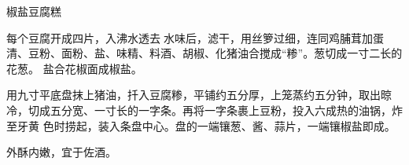 \begin{recipe}{椒盐豆腐糕}

\ingredients


\preparation

\step 每个豆腐开成四片，入沸水透去𥑲水味后，滤干，用丝箩过细，连同鸡脯茸加蛋
清、豆粉、面粉、盐、味精、料酒、胡椒、化猪油合搅成“糁”。葱切成一寸二长的花葱。
盐合花椒面成椒盐。

\step 用九寸平底盘抹上猪油，扦入豆腐糁，平铺约五分厚，上笼蒸约五分钟，取出晾
冷，切成五分宽、一寸长的一字条。再将一字条裹上豆粉，投入六成热的油锅，炸至牙黄
色时捞起，装入条盘中心。盘的一端镶葱、酱、蒜片，一端镶椒盐即成。

\features

外酥内嫩，宜于佐酒。

\end{recipe}

